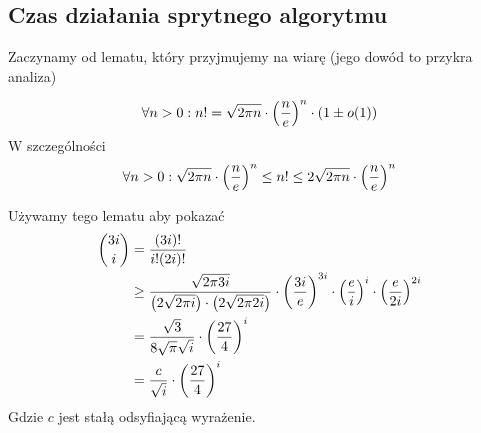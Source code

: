 \subsection{Czas działania sprytnego algorytmu}
Zaczynamy od lematu, który przyjmujemy na wiarę (jego dowód to przykra analiza)
\begin{lemma}
	\[
		\forall n > 0: n! = \sqrt{2\pi n}\cdot\left(\frac{n}{e}\right)^n \cdot (1 \pm o(1))
	\]
	W szczególności
	\[
		\forall n > 0: \sqrt{2\pi n}\cdot\left(\frac{n}{e}\right)^n \leq n! \leq 2\sqrt{2\pi n}\cdot\left(\frac{n}{e}\right)^n
	\]
\end{lemma}
Używamy tego lematu aby pokazać
\begin{align*}
	\binom{3i}{i}
	 & = \frac{(3i)!}{i!(2i)!}                                                               \\
	 & \geq \frac{\sqrt{2\pi 3i}}{\left(2\sqrt{2 \pi i}\right) \cdot \left(2\sqrt{2 \pi 2i}\right)}
	\cdot \left(\frac{3i}{e}\right)^{3i} \cdot \left(\frac{e}{i}\right)^i \cdot \left(\frac{e}{2i}\right)^{2i} \\
	 & = \frac{\sqrt{3}}{8\sqrt{\pi}\sqrt{i}} \cdot \left(\frac{27}{4}\right)^i                    \\
	 & = \frac{c}{\sqrt{i}}\cdot \left(\frac{27}{4}\right)^i
\end{align*}
Gdzie \( c \) jest stałą odsyfiającą wyrażenie.

